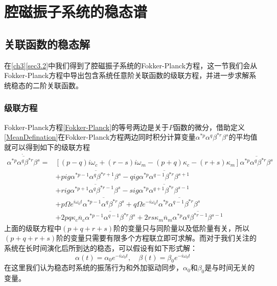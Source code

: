 
\chapter{腔磁振子系统的稳态谱}
\label{ch4}

\section{关联函数的稳态解}
在\ref{ch3}\ref{sec3.2}中我们得到了腔磁振子系统的Fokker-Planck方程，这一节我们会从Fokker-Planck方程中导出包含系统任意阶关联函数的级联方程，并进一步求解系统稳态的二阶关联函数。

\subsection{级联方程}
Fokker-Planck方程\eqref{Fokker-Planck}的等号两边是关于$P$函数的微分，借助定义\eqref{MeanDefination}在Fokker-Planck方程两边同时积分计算变量$\alpha^{*p}\alpha^{q}\beta^{*r}\beta^{s}$的平均值就可以得到如下的级联方程
\begin{equation}
\begin{aligned}
\dot{\overline{\alpha^{*p}\alpha^q\beta^{*r}\beta^s}}={}&\left[ (p-q)i\omega_{c}+(r-s)i\omega_{m}-(p+q)\kappa_{c}-(r+s)\kappa_{m}\right]\overline{\alpha^{*p}\alpha^q\beta^{*r}\beta^s} \\ &+pig\overline{\alpha^{*p-1}\alpha^q\beta^{*r+1}\beta^s} -qig\overline{\alpha^{*p}\alpha^{q-1}\beta^{*r}\beta^{s+1}} \\ &+rig\overline{\alpha^{*p+1}\alpha^q\beta^{*r-1}\beta^s} -sig\overline{\alpha^{*p}\alpha^{q+1}\beta^{*r}\beta^{s-1}}  \\
&+p\Omega e^{i\omega_{0}t}\overline{\alpha^{*p-1}\alpha^q\beta^{*r}\beta^s} +q\Omega e^{-i\omega_{0}t}\overline{\alpha^{*p}\alpha^{q-1}\beta^{*r}\beta^s} \\
&+2pq\kappa_{c}\overline{n}_{c}\overline{\alpha^{*p-1}\alpha^{q-1}\beta^{*r}\beta^s}
+2rs\kappa_{m}\overline{n}_{m}\overline{\alpha^{*p}\alpha^q\beta^{*r-1}\beta^{s-1}}
\label{HierarchicalEq}
\end{aligned}
\end{equation}
上面的级联方程中$(p+q+r+s)$阶的变量只与同阶量以及低阶量有关，所以$(p+q+r+s)$阶的变量只需要有限多个方程联立即可求解。而对于我们关注的系统在长时间演化后所到达的稳态，可以假设有如下形式解：
\begin{equation}
\alpha(t)=\alpha_{0}e^{-i\omega_{0}t}, \quad \beta(t)=\beta_{0}e^{-i\omega_{0}t}
\label{SolutionForm}
\end{equation}
在这里我们认为稳态时系统的振荡行为和外加驱动同步，$\alpha_{0}$和$\beta_{0}$是与时间无关的变量。

